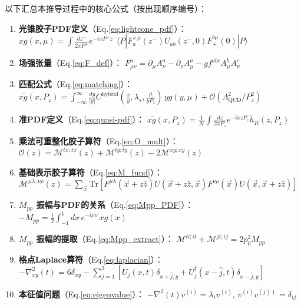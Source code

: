 \documentclass[11pt,a4paper]{article}
\newcommand{\LaMET}{\text{LaMET}}
\providecommand{\Tr}{\text{Tr}}
\newcommand{\hR}{\tilde{h}_R}
\newcommand{\Pz}{P_z}
\newcommand{\QCD}{\Lambda_{\text{QCD}}}
\begin{document}
以下汇总本推导过程中的核心公式（按出现顺序编号）：

\begin{enumerate}[label=(\arabic*), leftmargin=*]
    \item \textbf{光锥胶子PDF定义}（Eq.\ref{eq:lightcone_pdf}）：
    $x g(x, \mu) = \int \frac{dz^-}{2\pi P^+} e^{-ixP^+z^-} \langle P | F^{+\mu}_a(z^-) U_{ab}(z^-,0) F^{b\mu}_{+}(0) | P \rangle$

    \item \textbf{场强张量}（Eq.\ref{eq:F_def}）：
    $F^a_{\mu\nu} = \partial_\mu A^a_\nu - \partial_\nu A^a_\mu - g f^{abc} A^b_\mu A^c_\nu$

    \item \textbf{\LaMET 匹配公式}（Eq.\ref{eq:matching}）：
    $x\tilde{g}(x, \Pz) = \int_{-\infty}^{\infty} \frac{dy}{|y|} C^{\text{hybrid}}(\frac{x}{y}, \lambda_s, \frac{\mu}{y\Pz}) \, y g(y, \mu) + \mathcal{O}(\QCD^2/\Pz^2)$

    \item \textbf{准PDF定义}（Eq.\ref{eq:quasi-pdf}）：
    $x\tilde{g}(x, \Pz) = \frac{1}{\mathcal{N}} \int \frac{dz}{2\pi\Pz} e^{-ixz\Pz} \hR(z, \Pz)$

    \item \textbf{乘法可重整化胶子算符}（Eq.\ref{eq:O_mult}）：
    $\mathcal{O}(z) = \mathcal{M}^{tx;tx}(z) + \mathcal{M}^{ty;ty}(z) - 2\mathcal{M}^{xy;xy}(z)$

    \item \textbf{基础表示胶子算符}（Eq.\ref{eq:M_fund}）：
    $\mathcal{M}^{\mu\lambda,\nu\rho}(z) = \sum_{\vec{x}} \Tr[F^{\mu\lambda}(\vec{x}+z\hat{z}) U(\vec{x}+z\hat{z}, \vec{x}) F^{\nu\rho}(\vec{x}) U(\vec{x}, \vec{x}+z\hat{z})]$

    \item \textbf{$M_{pp}$ 振幅与PDF的关系}（Eq.\ref{eq:Mpp_PDF}）：
    $-M_{pp} = \frac{1}{2} \int_{-1}^{1} dx \, e^{-ix\nu} \, x g(x)$

    \item \textbf{$M_{pp}$ 振幅的提取}（Eq.\ref{eq:Mpp_extract}）：
    $\mathcal{M}^{ti;it} + \mathcal{M}^{ji;ij} = 2p_0^2 M_{pp}$

    \item \textbf{格点Laplace算符}（Eq.\ref{eq:laplacian}）：
    $-\nabla^2_{xy}(t) = 6\delta_{xy} - \sum_{j=1}^{3} [U_j(x,t)\delta_{x+\hat{j},y} + U^\dagger_j(x-\hat{j},t)\delta_{x-\hat{j},y}]$

    \item \textbf{本征值问题}（Eq.\ref{eq:eigenvalue}）：
    $-\nabla^2(t) v^{(i)} = \lambda_i v^{(i)}$, $v^{(i)} v^{(j)\dagger} = \delta_{ij}$


\end{enumerate}
\end{document}
